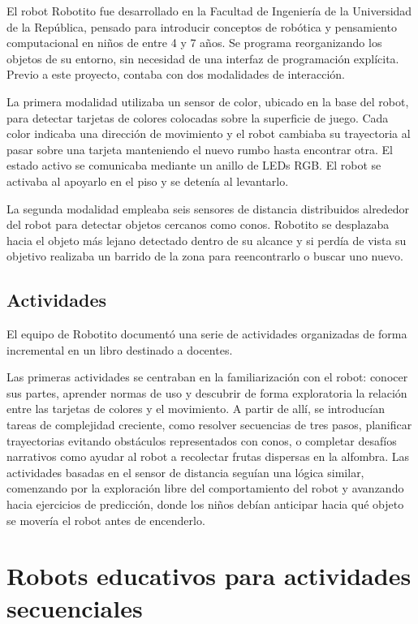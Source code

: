 \documentclass{prgrado}
\begin{document}
El robot Robotito fue desarrollado en la Facultad de Ingeniería de la Universidad de la República, pensado para introducir conceptos de robótica y pensamiento computacional en niños de entre 4 y 7 años. Se programa reorganizando los objetos de su entorno, sin necesidad de una interfaz de programación explícita. Previo a este proyecto, contaba con dos modalidades de interacción.

La primera modalidad utilizaba un sensor de color, ubicado en la base del robot, para detectar tarjetas de colores colocadas sobre la superficie de juego. Cada color indicaba una dirección de movimiento y el robot cambiaba su trayectoria al pasar sobre una tarjeta manteniendo el nuevo rumbo hasta encontrar otra. El estado activo se comunicaba mediante un anillo de LEDs RGB. El robot se activaba al apoyarlo en el piso y se detenía al levantarlo.

La segunda modalidad empleaba seis sensores de distancia distribuidos alrededor del robot para detectar objetos cercanos como conos. Robotito se desplazaba hacia el objeto más lejano detectado dentro de su alcance y si perdía de vista su objetivo realizaba un barrido de la zona para reencontrarlo o buscar uno nuevo.

\subsection{Actividades}

El equipo de Robotito documentó una serie de actividades organizadas de forma incremental en un libro destinado a docentes.

Las primeras actividades se centraban en la familiarización con el robot: conocer sus partes, aprender normas de uso y descubrir de forma exploratoria la relación entre las tarjetas de colores y el movimiento. A partir de allí, se introducían tareas de complejidad creciente, como resolver secuencias de tres pasos, planificar trayectorias evitando obstáculos representados con conos, o completar desafíos narrativos como ayudar al robot a recolectar frutas dispersas en la alfombra. Las actividades basadas en el sensor de distancia seguían una lógica similar, comenzando por la exploración libre del comportamiento del robot y avanzando hacia ejercicios de predicción, donde los niños debían anticipar hacia qué objeto se movería el robot antes de encenderlo.


\section{Robots educativos para actividades secuenciales}
\end{document}

